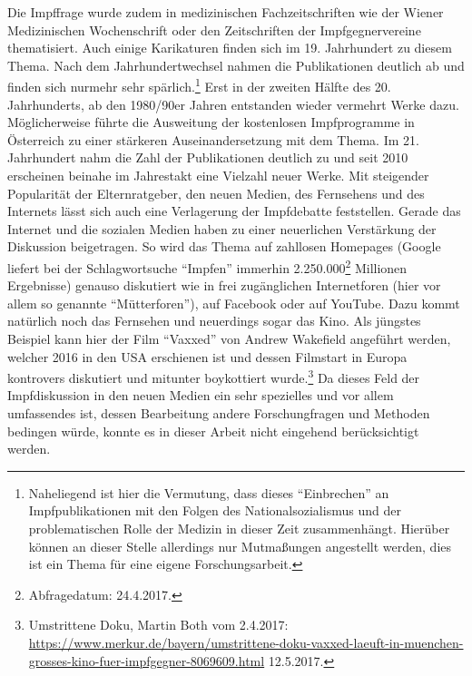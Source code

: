 \documentclass[
    a4paper,
    12pt,
    hyphens,
    chapterprefix=true,
    headheight=33pt,
    footheight=29pt,
    headings=optiontohead, %
]{scrartcl}
\begin{document}
{ Die Impffrage wurde zudem in medizinischen Fachzeitschriften wie der Wiener Medizinischen Wochenschrift oder den Zeitschriften der Impfgegnervereine thematisiert. Auch einige Karikaturen finden sich im 19. Jahrhundert zu diesem Thema. Nach dem Jahrhundertwechsel nahmen die Publikationen deutlich ab und finden sich nurmehr sehr spärlich.\footnote{Naheliegend ist hier die Vermutung, dass dieses "`Einbrechen"' an Impfpublikationen mit den Folgen des Nationalsozialismus und der problematischen Rolle der Medizin in dieser Zeit zusammenhängt. Hierüber können an dieser Stelle allerdings nur Mutmaßungen angestellt werden, dies ist ein Thema für eine eigene Forschungsarbeit.} Erst in der zweiten Hälfte des 20. Jahrhunderts, ab den 1980/90er Jahren entstanden wieder vermehrt Werke dazu. Möglicherweise führte die Ausweitung der kostenlosen Impfprogramme in Österreich zu einer stärkeren Auseinandersetzung mit dem Thema. Im 21. Jahrhundert nahm die Zahl der Publikationen deutlich zu und seit 2010 erscheinen beinahe im Jahrestakt eine Vielzahl neuer Werke. Mit steigender Popularität der Elternratgeber, den neuen Medien, des Fernsehens und des Internets lässt sich auch eine Verlagerung der Impfdebatte feststellen. Gerade das Internet und die sozialen Medien haben zu einer neuerlichen Verstärkung der Diskussion beigetragen. So wird das Thema auf zahllosen Homepages (Google liefert bei der Schlagwortsuche "`Impfen"' immerhin 2.250.000\footnote{Abfragedatum: 24.4.2017.} Millionen Ergebnisse) genauso diskutiert wie in frei zugänglichen Internetforen (hier vor allem so genannte "`Mütterforen"'), auf Facebook oder auf YouTube. Dazu kommt natürlich noch das Fernsehen und neuerdings sogar das Kino. Als jüngstes Beispiel kann hier der Film "`Vaxxed"' von Andrew Wakefield angeführt werden, welcher 2016 in den USA erschienen ist und dessen Filmstart in Europa kontrovers diskutiert und mitunter boykottiert wurde.\footnote{Umstrittene Doku, Martin Both vom 2.4.2017: \url{https://www.merkur.de/bayern/umstrittene-doku-vaxxed-laeuft-in-muenchen-grosses-kino-fuer-impfgegner-8069609.html} 12.5.2017.} Da dieses Feld der Impfdiskussion in den neuen Medien ein sehr spezielles und vor allem umfassendes ist, dessen Bearbeitung andere Forschungfragen und Methoden bedingen würde, konnte es in dieser Arbeit nicht eingehend berücksichtigt werden.\\

}
\end{document}
